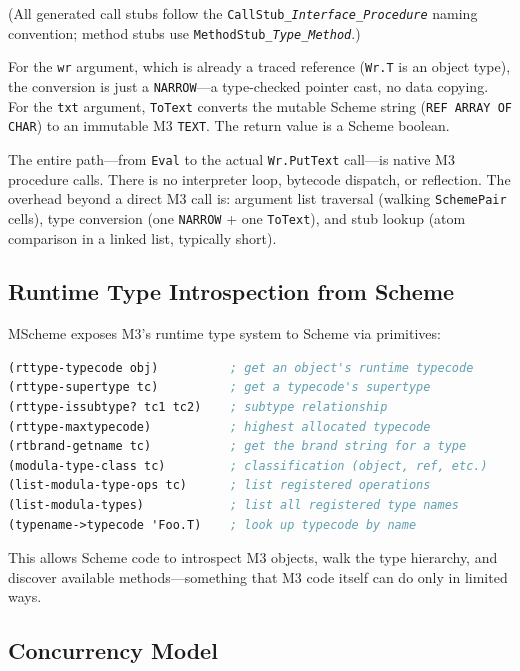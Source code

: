 \documentclass[11pt]{article}
\begin{document}
(All generated call stubs follow the
\texttt{CallStub\_\textit{Interface}\_\textit{Procedure}} naming
convention; method stubs use
\texttt{MethodStub\_\textit{Type}\_\textit{Method}}.)

For the \texttt{wr} argument, which is already a traced reference
(\texttt{Wr.T} is an object type), the conversion is just a
\texttt{NARROW}---a type-checked pointer cast, no data copying.  For
the \texttt{txt} argument, \texttt{ToText} converts the mutable
Scheme string (\texttt{REF ARRAY OF CHAR}) to an immutable M3
\texttt{TEXT}.  The return value is a Scheme boolean.

The entire path---from \texttt{Eval} to the actual \texttt{Wr.PutText}
call---is native M3 procedure calls.  There is no interpreter loop,
bytecode dispatch, or reflection.  The overhead beyond a direct M3
call is: argument list traversal (walking \texttt{SchemePair} cells),
type conversion (one \texttt{NARROW} + one \texttt{ToText}), and stub
lookup (atom comparison in a linked list, typically short).


\subsection{Runtime Type Introspection from Scheme}
\label{sec:introspection}

MScheme exposes M3's runtime type system to Scheme via primitives:

\begin{lstlisting}[language=Scheme]
(rttype-typecode obj)          ; get an object's runtime typecode
(rttype-supertype tc)          ; get a typecode's supertype
(rttype-issubtype? tc1 tc2)    ; subtype relationship
(rttype-maxtypecode)           ; highest allocated typecode
(rtbrand-getname tc)           ; get the brand string for a type
(modula-type-class tc)         ; classification (object, ref, etc.)
(list-modula-type-ops tc)      ; list registered operations
(list-modula-types)            ; list all registered type names
(typename->typecode 'Foo.T)    ; look up typecode by name
\end{lstlisting}

This allows Scheme code to introspect M3 objects, walk the type
hierarchy, and discover available methods---something that M3 code
itself can do only in limited ways.


\subsection{Concurrency Model}
\label{sec:concurrency}
\end{document}
